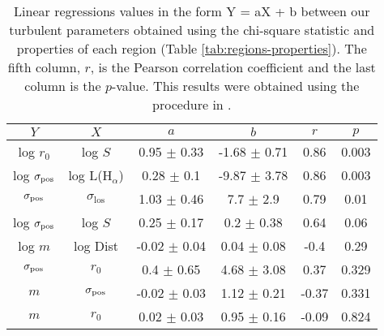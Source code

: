\begin{table*}
\begin{center}
\caption{Linear regressions values in the form Y = aX + b between our turbulent parameters obtained using the chi-square statistic and properties of each region (Table \ref{tab:regions-properties}). The fifth column, $r$, is the Pearson correlation coefficient and the last column is the $p$-value. This results were obtained using the procedure in \citet{2007ApJ...665.1489K}.}
\begin{tabular}{cccccc}
\hline
            $Y$ &                   $X$ &                 $a$ &                 $b$ &       $r$ &      $p$ \\
\hline
      log $r_0$ &         log $S$ &   0.95 $\pm$ 0.33 &  -1.68 $\pm$ 0.71 &   0.86 &  0.003 \\
   log \(\sigma_{\mathrm{pos}}\) &        log L(H\(_\alpha\)) &    0.28 $\pm$ 0.1 &  -9.87 $\pm$ 3.78 &   0.86 &  0.003 \\
 \(\sigma_{\mathrm{pos}}\) &  $\sigma_{\text{los}}$ &   1.03 $\pm$ 0.46 &     7.7 $\pm$ 2.9 &   0.79 &   0.01 \\
   log \(\sigma_{\mathrm{pos}}\) &         log $S$ &   0.25 $\pm$ 0.17 &    0.2 $\pm$ 0.38 &   0.64 &   0.06 \\
        log $m$ &        log Dist &  -0.02 $\pm$ 0.04 &   0.04 $\pm$ 0.08 &   -0.4 &   0.29 \\
       \(\sigma_{\mathrm{pos}}\) &         $r_{0}$ &    0.4 $\pm$ 0.65 &   4.68 $\pm$ 3.08 &   0.37 &  0.329 \\
            $m$ &        \(\sigma_{\mathrm{pos}}\) &  -0.02 $\pm$ 0.03 &   1.12 $\pm$ 0.21 &  -0.37 &  0.331 \\
            $m$ &         $r_{0}$ &   0.02 $\pm$ 0.03 &   0.95 $\pm$ 0.16 &  -0.09 &  0.824 \\
\bottomrule
\end{tabular}\label{tab:RestStats}
\end{center}
\end{table*}


